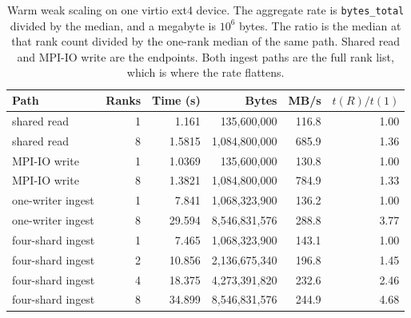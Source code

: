 \begin{table}[ht]
\centering
\scriptsize
\caption{Warm weak scaling on one virtio ext4 device. The aggregate rate is \texttt{bytes\_total} divided by the median, and a megabyte is $10^{6}$ bytes. The ratio is the median at that rank count divided by the one-rank median of the same path. Shared read and MPI-IO write are the endpoints. Both ingest paths are the full rank list, which is where the rate flattens.}
\label{tab:weak-io}
\begin{tabular}{lrrrrr}
\toprule
Path & Ranks & Time (s) & Bytes & MB/s & $t(R)/t(1)$ \\
\midrule
shared read & 1 & 1.161 & 135,600,000 & 116.8 & 1.00 \\
shared read & 8 & 1.5815 & 1,084,800,000 & 685.9 & 1.36 \\
MPI-IO write & 1 & 1.0369 & 135,600,000 & 130.8 & 1.00 \\
MPI-IO write & 8 & 1.3821 & 1,084,800,000 & 784.9 & 1.33 \\
one-writer ingest & 1 & 7.841 & 1,068,323,900 & 136.2 & 1.00 \\
one-writer ingest & 8 & 29.594 & 8,546,831,576 & 288.8 & 3.77 \\
four-shard ingest & 1 & 7.465 & 1,068,323,900 & 143.1 & 1.00 \\
four-shard ingest & 2 & 10.856 & 2,136,675,340 & 196.8 & 1.45 \\
four-shard ingest & 4 & 18.375 & 4,273,391,820 & 232.6 & 2.46 \\
four-shard ingest & 8 & 34.899 & 8,546,831,576 & 244.9 & 4.68 \\
\bottomrule
\end{tabular}
\end{table}
